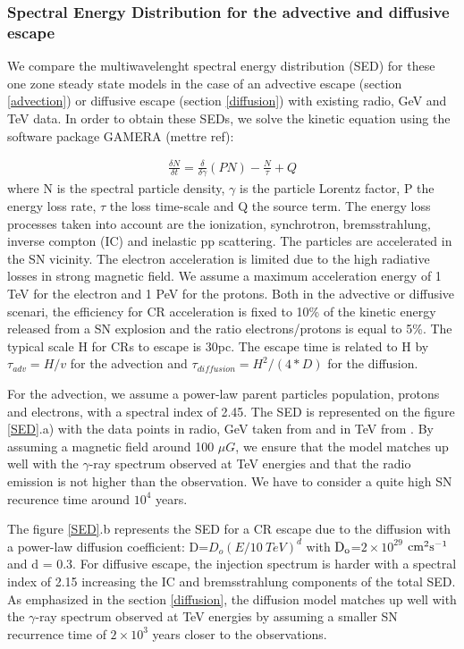 \documentclass[a4paper,fleqn,usenatbib]{mnras}
\begin{document}
\subsubsection{Spectral Energy Distribution for the advective and diffusive escape} 
We compare the multiwavelenght spectral energy distribution (SED) for these one zone steady state models in the case of an advective escape (section \ref{advection}) or diffusive escape (section \ref{diffusion}) with existing radio, GeV and TeV data. In order to obtain these SEDs, we solve the kinetic equation using the software package GAMERA (mettre ref):

\begin{eqnarray}
\frac{\delta N}{\delta t} = \frac{\delta }{\delta \gamma}(PN) - \frac{N}{\tau} + Q
\end{eqnarray}
  where N is the spectral particle density, $\gamma$ is the particle Lorentz factor, P the energy loss rate, $\tau$ the loss time-scale and Q the source term. The energy loss processes taken into account are the ionization, synchrotron, bremsstrahlung, inverse compton (IC) and inelastic pp scattering. The particles are accelerated in the SN vicinity. The electron acceleration is limited due to the high radiative losses in strong magnetic field. We assume a maximum acceleration energy of 1 TeV for the electron and 1 PeV for the protons. Both in the advective or diffusive scenari, the efficiency for CR acceleration is fixed to 10\% of the kinetic energy released from a SN explosion and the ratio electrons/protons is equal to 5\%. The typical scale H for CRs to escape is 30pc. The escape time is related to H by $\tau_{adv}=H/v$ for the advection and $\tau_{diffusion}=H^2/(4*D)$ for the diffusion.
  
For the advection, we assume a power-law parent particles population, protons and electrons, with a spectral index of 2.45. The SED is represented on the figure \ref{SED}.a) with the data points in radio, GeV taken from \cite{2014arXiv1410.1678M} and in TeV from \citet{2006Natur.439..695A}. By assuming a magnetic field around 100 $\mu G$, we ensure that the model matches up well with the $\gamma$-ray spectrum observed at TeV energies and that the radio emission is not higher than the observation. We have to consider a quite high SN recurence time around $10^4$ years.

The figure \ref{SED}.b represents the SED for a CR escape due to the diffusion with a power-law diffusion coefficient: D=$D_o {\left(E/10 \ TeV \right)}^{d}$ with $\rm D_o$=$2 \times 10^{29}$ $\rm cm^2s^{-1}$ and d = 0.3. For diffusive escape, the injection spectrum is harder with a spectral index of 2.15 increasing the IC and bremsstrahlung components of the total SED. As emphasized in the section \ref{diffusion}, the diffusion model matches up well with the $\gamma$-ray spectrum observed at TeV energies by assuming a smaller SN recurrence time of $2 \times 10^3$ years closer to the observations.
\end{document}
